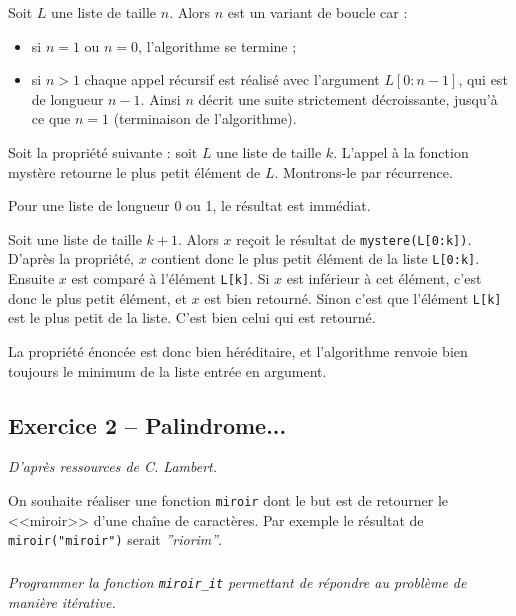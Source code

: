 \ifprof
\begin{corrige}
Soit $L$ une liste de taille $n$. Alors $n$ est un variant de boucle car : 
\begin{itemize}
\item si $n=1$ ou $n=0$, l'algorithme se termine ;
\item si $n>1$ chaque appel récursif est réalisé avec l'argument $L[0:n-1]$, qui est de longueur $n-1$. Ainsi $n$ 
décrit une suite strictement décroissante, jusqu'à ce que $n=1$ (terminaison de l'algorithme). 
\end{itemize}

\vspace{.25cm}

Soit la propriété suivante : soit $L$ une liste de taille $k$. L'appel à la fonction mystère retourne le plus petit 
élément de $L$. Montrons-le par récurrence.

Pour une liste de longueur 0 ou 1, le résultat est immédiat.



Soit une liste de taille $k+1$.  Alors $x$ reçoit le résultat de \texttt{mystere(L[0:k])}. D'après la propriété, $x$ 
contient donc le plus petit élément de la liste \texttt{L[0:k]}. Ensuite $x$ est comparé à l'élément \texttt{L[k]}. Si 
$x$ est inférieur à cet élément, c'est donc le plus petit élément, et $x$ est bien retourné. Sinon c'est que l'élément 
\texttt{L[k]} est le plus petit de la liste. C'est bien celui qui est retourné. 

La propriété énoncée est donc bien héréditaire, et l'algorithme renvoie bien toujours le minimum de la liste entrée en 
argument.
\end{corrige}
\else
\fi

\subsection*{Exercice 2 -- Palindrome...}
\setcounter{subparagraph}{0}
\ifprof
\else
\textit{D'après ressources de C. Lambert.}

On souhaite réaliser une fonction \texttt{miroir} dont le but est de retourner le <<miroir>> d'une chaîne de caractères. 
Par exemple le résultat de \texttt{miroir("miroir")} serait \textsl{''riorim''}.
\fi
\subparagraph{}
\textit{Programmer la fonction \texttt{miroir\_it} permettant de répondre au problème de manière itérative.}


